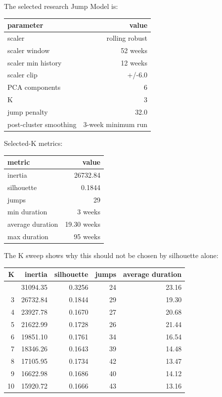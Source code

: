 The selected research Jump Model is:

{\def\LTcaptype{none} %
\begin{longtable}[]{@{}lr@{}}
\toprule\noalign{}
parameter & value \\
\midrule\noalign{}
\endhead
\bottomrule\noalign{}
\endlastfoot
scaler & rolling robust \\
scaler window & 52 weeks \\
scaler min history & 12 weeks \\
scaler clip & +/-6.0 \\
PCA components & 6 \\
K & 3 \\
jump penalty & 32.0 \\
post-cluster smoothing & 3-week minimum run \\
\end{longtable}
}

Selected-K metrics:

{\def\LTcaptype{none} %
\begin{longtable}[]{@{}lr@{}}
\toprule\noalign{}
metric & value \\
\midrule\noalign{}
\endhead
\bottomrule\noalign{}
\endlastfoot
inertia & 26732.84 \\
silhouette & 0.1844 \\
jumps & 29 \\
min duration & 3 weeks \\
average duration & 19.30 weeks \\
max duration & 95 weeks \\
\end{longtable}
}

The K sweep shows why this should not be chosen by silhouette alone:

{\def\LTcaptype{none} %
\begin{longtable}[]{@{}rrrrr@{}}
\toprule\noalign{}
K & inertia & silhouette & jumps & average duration \\
\midrule\noalign{}
\endhead
\bottomrule\noalign{}
\endlastfoot
2 & 31094.35 & 0.3256 & 24 & 23.16 \\
3 & 26732.84 & 0.1844 & 29 & 19.30 \\
4 & 23927.78 & 0.1670 & 27 & 20.68 \\
5 & 21622.99 & 0.1728 & 26 & 21.44 \\
6 & 19851.10 & 0.1761 & 34 & 16.54 \\
7 & 18346.26 & 0.1643 & 39 & 14.48 \\
8 & 17105.95 & 0.1734 & 42 & 13.47 \\
9 & 16622.98 & 0.1686 & 40 & 14.12 \\
10 & 15920.72 & 0.1666 & 43 & 13.16 \\
\end{longtable}
}


